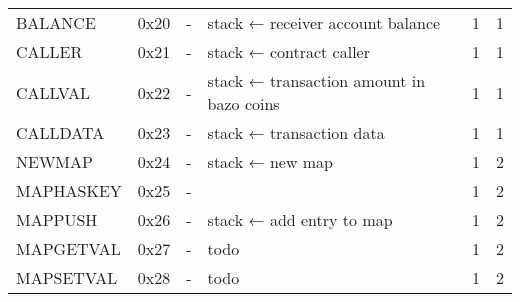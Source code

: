 \begin{longtable}[c]{L{2.5cm} L{1cm} L{3cm} L{5.5cm} R{0.8cm} R{1cm} }
BALANCE   & 0x20   & -                                                                                                        & stack ← receiver account balance                                                                            & 1         & 1          \\
CALLER    & 0x21   & -                                                                                                        & stack ← contract caller                                                                                     & 1         & 1          \\
CALLVAL   & 0x22   & -                                                                                                        & stack ← transaction amount in bazo coins                                                                    & 1         & 1          \\
CALLDATA  & 0x23   & -                                                                                                        & stack ← transaction data                                                                                    & 1         & 1          \\
NEWMAP    & 0x24   & -                                                                                                        & stack ← new map                                                                                             & 1         & 2          \\
MAPHASKEY  & 0x25   & -                                                                                                        &                                                                                                             & 1         & 2          \\
MAPPUSH   & 0x26   & -                                                                                                        & stack ← add entry to map                                                                                    & 1         & 2          \\
MAPGETVAL & 0x27   & -                                                                                                        & todo                                                                                                        & 1         & 2          \\
MAPSETVAL & 0x28   & -                                                                                                        & todo                                                                                                        & 1         & 2          \\

\end{longtable}
